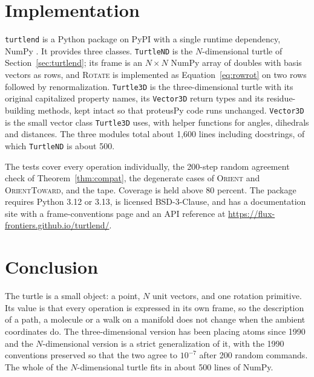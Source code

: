 \documentclass[11pt,letterpaper]{article}
\newcommand{\code}[1]{\texttt{#1}}
\newcommand{\op}[1]{\textup{\textsc{#1}}}
\begin{document}
\section{Implementation}
\label{sec:implementation}

\code{turtlend} is a Python package on PyPI with a single runtime
dependency, NumPy \citep{harris2020numpy}. It provides three classes.
\code{TurtleND} is the $N$-dimensional turtle of
Section~\ref{sec:turtlend}; its frame is an $N \times N$ NumPy array of
doubles with basis vectors as rows, and \op{Rotate} is implemented
as Equation~\eqref{eq:rowrot} on two rows followed by renormalization.
\code{Turtle3D} is the three-dimensional turtle with its original
capitalized property names, its \code{Vector3D} return types and its
residue-building methods, kept intact so that proteusPy code runs
unchanged. \code{Vector3D} is the small vector class \code{Turtle3D}
uses, with helper functions for angles, dihedrals and distances. The
three modules total about 1{,}600 lines including docstrings, of which
\code{TurtleND} is about 500.

The tests cover every operation individually, the 200-step random
agreement check of Theorem~\ref{thm:compat}, the degenerate cases of
\op{Orient} and \op{OrientToward}, and the tape. Coverage is
held above 80 percent. The package requires Python 3.12 or 3.13,
is licensed BSD-3-Clause, and has a documentation site with a
frame-conventions page and an API reference at
\url{https://flux-frontiers.github.io/turtlend/}.

\section{Conclusion}
\label{sec:conclusion}

The turtle is a small object: a point, $N$ unit vectors, and one
rotation primitive. Its value is that every operation is expressed in
its own frame, so the description of a path, a molecule or a walk on a
manifold does not change when the ambient coordinates do. The
three-dimensional version has been placing atoms since 1990 and the
$N$-dimensional version is a strict generalization of it, with the
1990 conventions preserved so that the two agree to $10^{-7}$ after
200 random commands. The whole of the $N$-dimensional turtle fits in
about 500 lines of NumPy.



\end{document}
